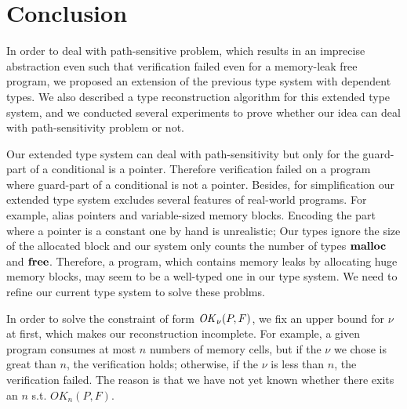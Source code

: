 \section{Conclusion}
\label{sec:conclusion}
In order to deal with path-sensitive problem, which results in an
imprecise abstraction even such that verification failed even for a
memory-leak free program, we proposed an extension of the previous
type system with dependent types.  We also described a type
reconstruction algorithm for this extended type system, and we
conducted several experiments to prove whether our idea can deal with
path-sensitivity problem or not.

Our extended type system can deal with path-sensitivity but only for
the guard-part of a conditional is a pointer. Therefore verification
failed on a program where guard-part of a conditional is not a
pointer. Besides, for simplification our extended type system excludes
several features of real-world programs. For example, alias pointers
and variable-sized memory blocks. Encoding the part where a pointer is
a constant one by hand is unrealistic; Our types ignore the size of
the allocated block and our system only counts the number of types
\(\mathbf{malloc}\) and \(\mathbf{free}\). Therefore, a program, which contains memory
leaks by allocating huge memory blocks, may seem to be a well-typed
one in our type system.  We need to refine our current type system to
solve these problms.

In order to solve the constraint of form \(\mathit{OK}_\nu(P, F)\), we fix an
upper bound for \(\nu\) at first, which makes our reconstruction
incomplete. For example, a given program consumes at most \(n\)
numbers of memory cells, but if the \(\nu\) we chose is great than
\(n\), the verification holds; otherwise, if the \(\nu\) is less than
\(n\), the verification failed. The reason is that we have not yet
known whether there exits an \(n\) s.t. \(OK_n(P, F)\).
